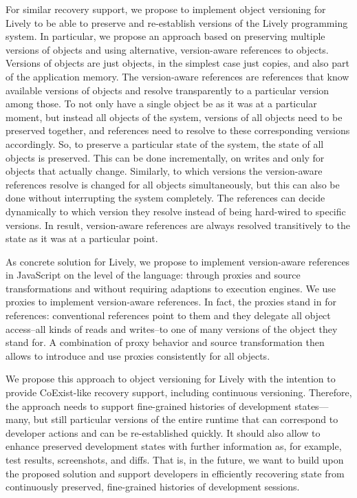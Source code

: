 For similar recovery support, we propose to implement object versioning for Lively to be able to preserve and re-establish versions of the Lively programming system.
In particular, we propose an approach based on preserving multiple versions of objects and using alternative, version-aware references to objects.
Versions of objects are just objects, in the simplest case just copies, and also part of the application memory.
The version-aware references are references that know available versions of objects and resolve transparently to a particular version among those.
To not only have a single object be as it was at a particular moment, but instead all objects of the system, versions of all objects need to be preserved together, and references need to resolve to these corresponding versions accordingly.
So, to preserve a particular state of the system, the state of all objects is preserved.
This can be done incrementally, on writes and only for objects that actually change.
Similarly, to which versions the version-aware references resolve is changed for all objects simultaneously, but this can also be done without interrupting the system completely.
The references can decide dynamically to which version they resolve instead of being hard-wired to specific versions.
In result, version-aware references are always resolved transitively to the state as it was at a particular point.

As concrete solution for Lively, we propose to implement version-aware references in JavaScript on the level of the language: through proxies and source transformations and without requiring adaptions to execution engines.
We use proxies to implement version-aware references.
In fact, the proxies stand in for references: conventional references point to them and they delegate all object access--all kinds of reads and writes--to one of many versions of the object they stand for.
A combination of proxy behavior and source transformation then allows to introduce and use proxies consistently for all objects.

We propose this approach to object versioning for Lively with the intention to provide CoExist-like recovery support, including continuous versioning.
Therefore, the approach needs to support fine-grained histories of development states---many, but still particular versions of the entire runtime that can correspond to developer actions and can be re-established quickly.
It should also allow to enhance preserved development states with further information as, for example, test results, screenshots, and diffs.
That is, in the future, we want to build upon the proposed solution and support developers in efficiently recovering state from continuously preserved, fine-grained histories of development sessions.\\

